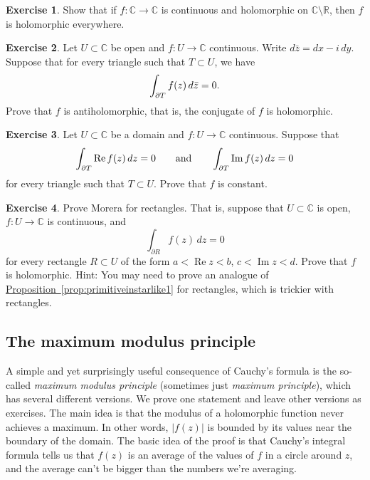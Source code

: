 \documentclass[12pt,openany]{book}
\newcommand{\avoidbreak}{\postdisplaypenalty=100}
\renewcommand{\Re}{\operatorname{Re}}
\renewcommand{\Im}{\operatorname{Im}}
\newcommand{\sabs}[1]{\lvert {#1} \rvert}
\newcommand{\C}{{\mathbb{C}}}
\newcommand{\R}{{\mathbb{R}}}
\theoremstyle{plain}
\theoremstyle{remark}
\theoremstyle{definition}
\newenvironment{exbox}{%
    \def\FrameCommand{\vrule width 1pt \relax\hspace{10pt}}%
    \MakeFramed{\advance\hsize-\width\FrameRestore}%
}{%
    \endMakeFramed
}
\theoremstyle{exercise}
\newtheorem{exercise}{Exercise}[section]
\theoremstyle{example}
\newcommand{\propref}[1]{\hyperref[#1]{Proposition~\ref*{#1}}}
\begin{document}
\begin{exbox}
\begin{exercise}
Show that if $f \colon \C \to \C$ is continuous and holomorphic on $\C
\setminus \R$, then $f$ is holomorphic everywhere.
\end{exercise}

\begin{exercise}
Let $U \subset \C$ be open and $f \colon U \to \C$ continuous.
Write $d\bar{z} = dx - i \, dy$.
Suppose that 
for every triangle such that $T \subset U$, we have
\begin{equation*}
\int_{\partial T} f(z) \, d\bar{z} = 0 .
\avoidbreak
\end{equation*}
Prove that $f$
is antiholomorphic, that is, the conjugate of $f$ is holomorphic.
\end{exercise}

\begin{exercise}
Let $U \subset \C$ be a domain and $f \colon U \to \C$ continuous.
Suppose that
\begin{equation*}
\int_{\partial T} \Re f(z) \, dz = 0
\qquad \text{and} \qquad
\int_{\partial T} \Im f(z) \, dz = 0
\avoidbreak
\end{equation*}
for every triangle such that $T \subset U$.  Prove that $f$ is constant.
\end{exercise}

\begin{exercise}
Prove Morera for rectangles.  That is, suppose that $U \subset \C$ is open,
$f \colon U \to \C$ is continuous,
and
\begin{equation*}
\int_{\partial R} f(z) \, dz = 0
\end{equation*}
for every rectangle $R \subset U$ of the form
$a < \Re z < b$, $c < \Im z < d$.  Prove that $f$ is holomorphic.
Hint:  You may need to prove an analogue of
\propref{prop:primitiveinstarlike1} for rectangles, which is trickier with
rectangles.
\end{exercise}
\end{exbox}

\subsection{The maximum modulus principle}

A simple and yet surprisingly useful consequence of Cauchy's formula is the
so-called \emph{maximum modulus principle}
(sometimes just \emph{maximum principle}),
which has several different versions.
We prove one statement and leave other versions as exercises.
The main idea is that the modulus of a holomorphic function never
achieves a maximum.  In other words, $\sabs{f(z)}$ is bounded
by its values near the boundary of the domain.
The basic idea of the proof is that Cauchy's integral formula tells us that
$f(z)$ is an average of the values of $f$ in a circle around $z$, and the
average can't be bigger than the numbers we're averaging.
\end{document}
